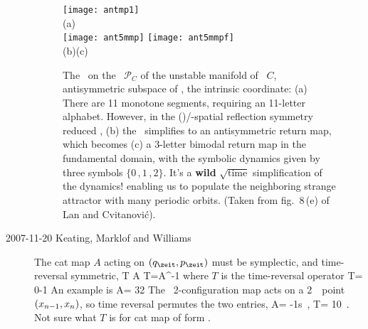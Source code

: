 \begin{description}

\begin{figure}%
    \centering
\texttt{[image: antmp1]}
\\
\hspace{0.10\textwidth}
(a)
\\
\texttt{[image: ant5mmp]}
\texttt{[image: ant5mmpf]}
\\
\hspace{0.10\textwidth}(b)\hspace{0.44\textwidth}(c)
\caption[]{
The \PoincMap\ on the \PoincSec\ $\mathcal{P}_C$ of the
unstable manifold of \eqv\ $C$, antisymmetric subspace of \KS, the
intrinsic coordinate:
(a) There are 11 monotone segments, requiring an 11-letter alphabet.
However, in the (\KS)/{}-spatial reflection symmetry reduced
\statesp,
(b)
the \PoincMap\ simplifies to an antisymmetric return map,
which becomes
(c)
a 3-letter bimodal return map in the fundamental domain, with the
symbolic dynamics given by three symbols $\{0\,,1\,,2\}$.
It's a \textbf{wild} $\sqrt{\mbox{time}}$ simplification of the dynamics!
enabling us to populate the neighboring strange attractor with
many periodic orbits.
(Taken from fig.~8\,(e) of Lan and Cvitanovi\'c).
      }
\label{f:antmn1}
\end{figure}

    \item[2007-11-20 Keating,  Marklof and Williams]
The cat map $A$ acting on $(q_\zeit,p_\zeit)$  must be symplectic, and
time-reversal symmetric,
\beq
T A T=A^{-1}
where $T$ is the time-reversal operator
\beq
T=
         {0}{-1}
An example is
\beq
A=
         {3}{2}
The \PV\ 2-configuration map 
acts on a 2\dmn\ \statesp\ point $(x_{n-1},x_{n})$,
so time reversal permutes the two entries,
\beq
A=
         {-1}{s}
\,,\qquad
T=
         {1}{0}
\,.
Not sure what $T$ is for cat map of form .



\end{description}
